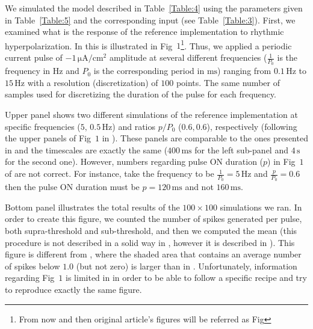 \documentclass[10pt,a4paper,onecolumn]{article}
\newcommand{\Rm}[1]{\mathrm{#1}}
\begin{document}
We simulated the model described in Table~\ref{Table:4} using the parameters
given in Table~\ref{Table:5} and the corresponding input (see 
Table~\ref{Table:3}). First, we examined what is the response of the reference 
implementation to rhythmic hyperpolarization. In \cite{wang:1994} this is 
illustrated in Fig~$1$\footnote{From now and then original article's figures
    will be referred as Fig}. 
Thus, we applied a periodic current pulse of $-1\,\Rm{\mu A/cm^2}$ amplitude at
several different frequencies ($\frac{1}{P_0}$ is the frequency in $\Rm{Hz}$
and $P_0$ is the corresponding period in $\Rm{ms}$) ranging from 
$0.1\,\Rm{Hz}$ to $15\,\Rm{Hz}$ with a resolution (discretization) of $100$ 
points. The same number of samples used for discretizing the duration of the
pulse for each frequency. 

Upper panel shows two different simulations of the reference implementation at
specific frequencies ($5,\, 0.5\, \Rm{Hz}$) and ratios $p/P_0$ ($0.6, 0.6$),
respectively (following the upper panels of Fig~$1$ in \cite{wang:1994}).
These panels are comparable to the ones presented in \cite{wang:1994} and the 
timescales are exactly the same ($400\, \Rm{ms}$ for the left sub-panel and
$4\, \Rm{s}$ for the second one). However, numbers regarding pulse ON duration
($p$) in Fig~$1$ of \cite{wang:1994} are not correct. For instance, take the
frequency to be $\frac{1}{P_0} = 5\, \Rm{Hz}$ and $\frac{p}{P_0} = 0.6$ then
the pulse ON duration must be $p = 120\, \Rm{ms}$ and not $160\, \Rm{ms}$. 

Bottom panel illustrates the total results of the $100 \times 100$ simulations
we ran.  In order to create this figure, we counted the number of spikes
generated per pulse, both supra-threshold and sub-threshold, and then we 
computed the mean (this procedure is not described in a solid way in
\cite{wang:1994}, however it is described in \cite{mccormick:1990}).  
This figure is different from \cite{wang:1994}, where the shaded area that 
contains an average number of spikes below $1.0$ (but not zero) is larger
than in \cite{wang:1994}. Unfortunately, information regarding Fig~$1$
is limited in \cite{wang:1994} in order to be able to follow a specific recipe
and try to reproduce exactly the same figure. 
\end{document}
